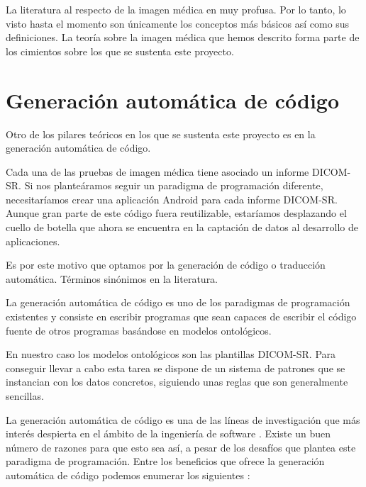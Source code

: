 La literatura al respecto de la imagen médica en muy profusa. Por lo tanto, lo visto hasta el momento son únicamente los conceptos más básicos así como sus definiciones. La teoría sobre la imagen médica que hemos descrito forma parte de los cimientos sobre los que se sustenta este proyecto.\par

\section{Generación automática de código}\label{sec:generacion-codigo}
Otro de los pilares teóricos en los que se sustenta este proyecto es en la generación automática de código.\par
Cada una de las pruebas de imagen médica tiene asociado un informe DICOM-SR. Si nos planteáramos seguir un paradigma de programación diferente, necesitaríamos crear una aplicación Android para cada informe DICOM-SR. Aunque gran parte de este código fuera reutilizable, estaríamos desplazando el cuello de botella que ahora se encuentra en la captación de datos al desarrollo de aplicaciones.\par
Es por este motivo que optamos por la generación de código o traducción automática. Términos sinónimos en la literatura.\cite{802346}\medskip\par 
La generación automática de código es uno de los paradigmas de programación existentes y consiste en escribir programas que sean capaces de escribir el código fuente de otros programas basándose en modelos ontológicos.\par 
En nuestro caso los modelos ontológicos son las plantillas DICOM-SR. Para conseguir llevar a cabo esta tarea se dispone de un sistema de patrones que se instancian con los datos concretos, siguiendo unas reglas que son generalmente sencillas.\medskip\par
La generación automática de código es una de las líneas de investigación que más interés despierta en el ámbito de la ingeniería de software \cite{hinchey2005requirements}. Existe un buen número de razones para que esto sea así, a pesar de los desafíos que plantea este paradigma de programación. Entre los beneficios que ofrece la generación automática de código podemos enumerar los siguientes \cite{herrington2003code}:
